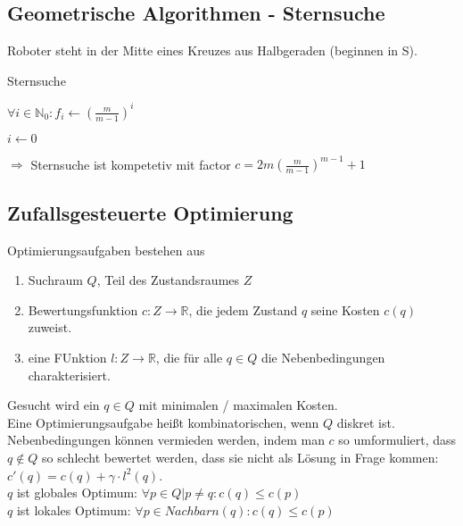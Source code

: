 \subsection{Geometrische Algorithmen - Sternsuche}

Roboter steht in der Mitte eines Kreuzes aus Halbgeraden (beginnen in S).\\

\begin{algorithm}[H]
	\caption{Sternsuche}
        
        $\forall i \in \mathbb{N}_0 : f_i \leftarrow \left(\frac{m}{m-1}\right)^i$

	$i \leftarrow 0$
	
\end{algorithm}

$\Rightarrow$ Sternsuche ist kompetetiv mit factor $c = 2m \left(\frac{m}{m-1}\right)^{m-1}+1$



\subsection{Zufallsgesteuerte Optimierung}
Optimierungsaufgaben bestehen aus 
\begin{enumerate}
\item Suchraum $Q$, Teil des Zustandsraumes $Z$
\item Bewertungsfunktion $c: Z \rightarrow \mathbb{R}$, die jedem Zustand $q$ seine Kosten $c(q)$ zuweist.
\item eine FUnktion $l: Z \rightarrow \mathbb{R}$, die für alle $q \in Q$ die Nebenbedingungen charakterisiert.
\end{enumerate}
Gesucht wird ein $q \in Q$ mit minimalen / maximalen Kosten.\\
Eine Optimierungsaufgabe heißt kombinatorischen, wenn $Q$ diskret ist.\\
Nebenbedingungen können vermieden werden, indem man $c$ so umformuliert, dass
$q \not\in Q$ so schlecht bewertet werden, dass sie nicht als Lösung in Frage kommen:
$c'(q) = c(q) + \gamma \cdot l^2(q)$.\\
$q$ ist globales Optimum: $\forall p \in Q | p \ne q: c(q) \le c(p)$\\
$q$ ist lokales Optimum: $\forall p \in Nachbarn(q): c(q) \le c(p)$\\

